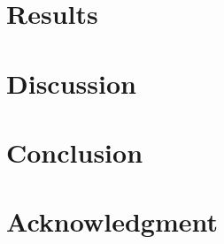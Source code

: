 \documentclass[conference]{IEEEtran}
\begin{document}
\section{Results} %

\section{Discussion} %

\section{Conclusion} %

\section*{Acknowledgment} %




\end{document}
